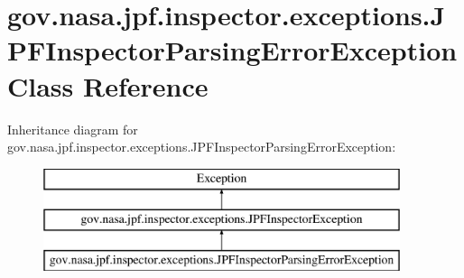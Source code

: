 \hypertarget{classgov_1_1nasa_1_1jpf_1_1inspector_1_1exceptions_1_1_j_p_f_inspector_parsing_error_exception}{}\section{gov.\+nasa.\+jpf.\+inspector.\+exceptions.\+J\+P\+F\+Inspector\+Parsing\+Error\+Exception Class Reference}
\label{classgov_1_1nasa_1_1jpf_1_1inspector_1_1exceptions_1_1_j_p_f_inspector_parsing_error_exception}
Inheritance diagram for gov.\+nasa.\+jpf.\+inspector.\+exceptions.\+J\+P\+F\+Inspector\+Parsing\+Error\+Exception\+:\begin{figure}[H]
\begin{center}
\leavevmode
\includegraphics[height=3.000000cm]{classgov_1_1nasa_1_1jpf_1_1inspector_1_1exceptions_1_1_j_p_f_inspector_parsing_error_exception}
\end{center}
\end{figure}
